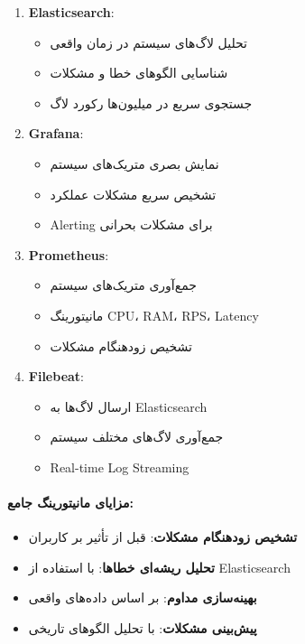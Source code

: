 \documentclass[
]{article}
\providecommand{\tightlist}{%
  \setlength{\itemsep}{0pt}\setlength{\parskip}{0pt}}
\begin{document}
\begin{enumerate}
\def\labelenumi{\arabic{enumi}.}
\item
  \textbf{Elasticsearch}:

  \begin{itemize}
  \tightlist
  \item
    تحلیل لاگ‌های سیستم در زمان واقعی
  \item
    شناسایی الگوهای خطا و مشکلات
  \item
    جستجوی سریع در میلیون‌ها رکورد لاگ
  \end{itemize}
\item
  \textbf{Grafana}:

  \begin{itemize}
  \tightlist
  \item
    نمایش بصری متریک‌های سیستم
  \item
    تشخیص سریع مشکلات عملکرد
  \item
    Alerting برای مشکلات بحرانی
  \end{itemize}
\item
  \textbf{Prometheus}:

  \begin{itemize}
  \tightlist
  \item
    جمع‌آوری متریک‌های سیستم
  \item
    مانیتورینگ CPU، RAM، RPS، Latency
  \item
    تشخیص زودهنگام مشکلات
  \end{itemize}
\item
  \textbf{Filebeat}:

  \begin{itemize}
  \tightlist
  \item
    ارسال لاگ‌ها به Elasticsearch
  \item
    جمع‌آوری لاگ‌های مختلف سیستم
  \item
    Real-time Log Streaming
  \end{itemize}
\end{enumerate}

\paragraph{مزایای مانیتورینگ
جامع:}\label{ux645ux632ux627ux6ccux627ux6cc-ux645ux627ux646ux6ccux62aux648ux631ux6ccux646ux6af-ux62cux627ux645ux639}

\begin{itemize}
\tightlist
\item
  \textbf{تشخیص زودهنگام مشکلات}: قبل از تأثیر بر کاربران
\item
  \textbf{تحلیل ریشه‌ای خطاها}: با استفاده از Elasticsearch
\item
  \textbf{بهینه‌سازی مداوم}: بر اساس داده‌های واقعی
\item
  \textbf{پیش‌بینی مشکلات}: با تحلیل الگوهای تاریخی
\end{itemize}
\end{document}
